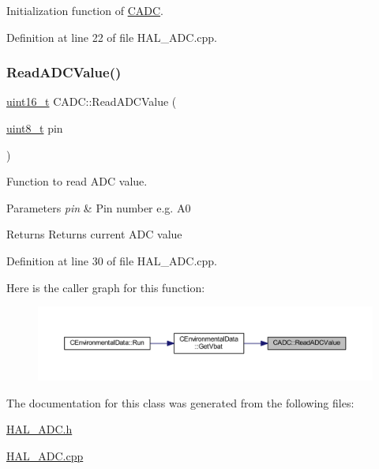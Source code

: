Initialization function of \mbox{\hyperlink{class_c_a_d_c}{C\+A\+DC}}. 



Definition at line 22 of file H\+A\+L\+\_\+\+A\+D\+C.\+cpp.

\mbox{\label{class_c_a_d_c_ac2f897fc64f605751ac3ffe7d2704ba6}} 
\subsubsection{\texorpdfstring{ReadADCValue()}{ReadADCValue()}}
{\footnotesize\ttfamily \mbox{\hyperlink{_a_d_a_s___types_8h_a1f1825b69244eb3ad2c7165ddc99c956}{uint16\+\_\+t}} C\+A\+D\+C\+::\+Read\+A\+D\+C\+Value (\begin{DoxyParamCaption}\item[{\mbox{\hyperlink{_a_d_a_s___types_8h_aba7bc1797add20fe3efdf37ced1182c5}{uint8\+\_\+t}}}]{pin }\end{DoxyParamCaption})}



Function to read A\+DC value. 


\begin{DoxyParams}{Parameters}
{\em pin} & Pin number e.\+g. A0 \\
\hline
\end{DoxyParams}
\begin{DoxyReturn}{Returns}
Returns current A\+DC value 
\end{DoxyReturn}


Definition at line 30 of file H\+A\+L\+\_\+\+A\+D\+C.\+cpp.

Here is the caller graph for this function\+:
\nopagebreak
\begin{figure}[H]
\begin{center}
\leavevmode
\includegraphics[width=350pt]{class_c_a_d_c_ac2f897fc64f605751ac3ffe7d2704ba6_icgraph}
\end{center}
\end{figure}


The documentation for this class was generated from the following files\+:\begin{DoxyCompactItemize}
\item 
\mbox{\hyperlink{_h_a_l___a_d_c_8h}{H\+A\+L\+\_\+\+A\+D\+C.\+h}}\item 
\mbox{\hyperlink{_h_a_l___a_d_c_8cpp}{H\+A\+L\+\_\+\+A\+D\+C.\+cpp}}\end{DoxyCompactItemize}
